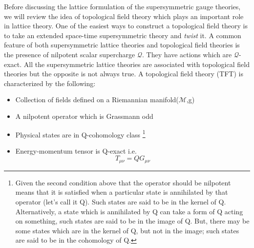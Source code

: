 Before discussing the lattice formulation of the supersymmetric gauge theories, we will review
the idea of topological field theory which plays an important role in lattice theory. 
One of the easiest ways to construct a topological field theory is to 
take an extended space-time supersymmetric theory and \textit{twist} it. A common feature of both supersymmetric lattice
theories and topological field theories is the presence of nilpotent scalar supercharge $\mathcal{Q}$. 
They have actions which are $\mathcal{Q}$-exact. 
All the supersymmetric lattice theories are associated with topological field theories but the opposite is not always true. 
A topological field theory (TFT) is characterized by the following:
\vspace{3mm} 
\begin{itemize}
\item Collection of fields defined on a Riemannian manifold($\textbf{$\mathcal{M}$}$,g)
\item A nilpotent operator which is Grassmann odd
\item Physical states are in Q-cohomology class \footnote{Given the second condition above that the operator should 
be nilpotent means that it is satisfied when a particular state is annihilated by that operator (let's call it Q). Such states 
are said to be in the kernel of Q. Alternatively, a state which is annihilated by Q can take a form of Q acting on something, 
such states are said to be in the image of Q. But, there may be some states which are in the kernel of Q, but not in the image; 
such states are said to be in the cohomology of Q.} 
\item Energy-momentum tensor is Q-exact i.e. \[ T_{\mu\nu} = Q G_{\mu\nu} \]
\end{itemize}


